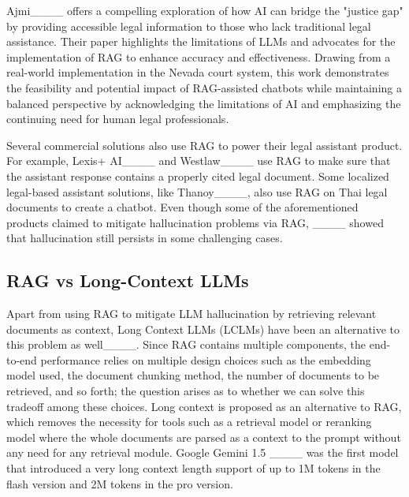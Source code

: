 Ajmi____ offers a compelling exploration of how AI can bridge the "justice gap" by providing accessible legal information to those who lack traditional legal assistance. 
%
Their paper highlights the limitations of LLMs and advocates for the implementation of RAG to enhance accuracy and effectiveness. 
%
Drawing from a real-world implementation in the Nevada court system, this work demonstrates the feasibility and potential impact of RAG-assisted chatbots while maintaining a balanced perspective by acknowledging the limitations of AI and emphasizing the continuing need for human legal professionals.

Several commercial solutions also use RAG to power their legal assistant product.
%
For example, Lexis+ AI____ and Westlaw____ use RAG to make sure that the assistant response contains a properly cited legal document. 
%
Some localized legal-based assistant solutions, like Thanoy____, also use RAG on Thai legal documents to create a chatbot. 
%
{Even though some of the aforementioned products claimed to mitigate hallucination problems via RAG, ____ showed that hallucination still persists in some challenging cases.}


\subsection{RAG vs Long-Context LLMs}

{
Apart from using RAG to mitigate LLM hallucination by retrieving relevant documents as context, Long Context LLMs (LCLMs) have been an alternative to this problem as well____. 
%
Since RAG contains multiple components, the end-to-end performance relies on multiple design choices such as the embedding model used, the document chunking method, the number of documents to be retrieved, and so forth; the question arises as to whether we can solve this tradeoff among these choices. 
%
Long context is proposed as an alternative to RAG, which removes the necessity for tools such as a retrieval model or reranking model where the whole documents are parsed as a context to the prompt without any need for any retrieval module.
%
Google Gemini 1.5 ____ was the first model that introduced a very long context length support of up to 1M tokens in the flash version and 2M tokens in the pro version. 

}

